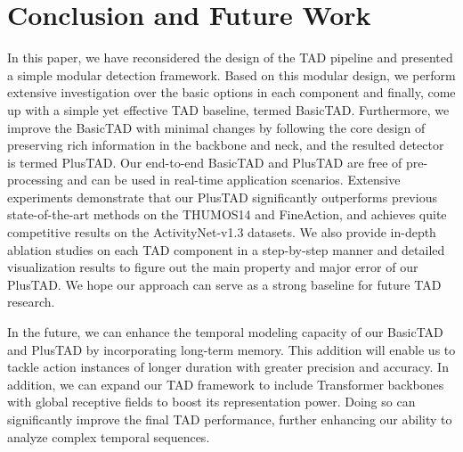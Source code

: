 \documentclass[a4paper,fleqn]{cas-dc}
\begin{document}
\section{Conclusion and Future Work}
\label{conclusions}
In this paper, we have reconsidered the design of the TAD pipeline and presented a simple modular detection framework. Based on this modular design, we perform extensive investigation over the basic options in each component and finally, come up with a simple yet effective TAD baseline, termed BasicTAD. Furthermore, we improve the BasicTAD with minimal changes by following the core design of preserving rich information in the backbone and neck, and the resulted detector is termed PlusTAD. Our end-to-end BasicTAD and PlusTAD are free of pre-processing and can be used in real-time application scenarios. Extensive experiments demonstrate that our PlusTAD significantly outperforms previous state-of-the-art methods on the THUMOS14 and FineAction, and achieves quite competitive results on the ActivityNet-v1.3 datasets. We also provide in-depth ablation studies on each TAD component in a step-by-step manner and detailed visualization results to figure out the main property and major error of our PlusTAD. We hope our approach can serve as a strong baseline for future TAD research.

In the future, we can enhance the temporal modeling capacity of our BasicTAD and PlusTAD by incorporating long-term memory. This addition will enable us to tackle action instances of longer duration with greater precision and accuracy. In addition, we can expand our TAD framework to include Transformer backbones with global receptive fields to boost its representation power. Doing so can significantly improve the final TAD performance, further enhancing our ability to analyze complex temporal sequences.


























 
\end{document}
